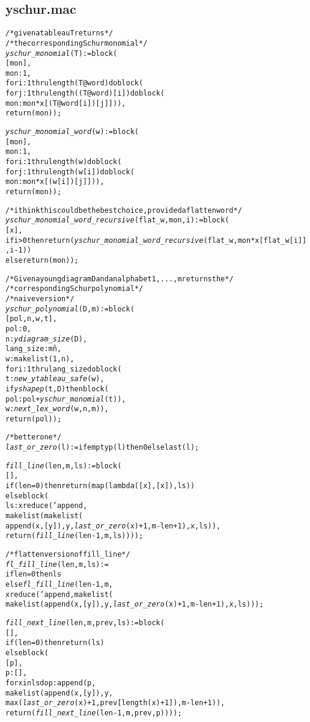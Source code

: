 \subsection*{yschur.mac}
\begin{alltt}
\footnotesize
/* given a tableau T returns */
/* the corresponding Schur monomial */
\emph{yschur\_monomial} (T) := block (
  [mon],
  mon : 1,
  for i : 1 thru length (T@word) do block (
    for j : 1 thru length ((T@word)[i]) do block (
      mon : mon*x[(T@word[i])[j]])),
  return (mon)); 

\emph{yschur\_monomial\_word} (w) := block (
  [mon],
  mon : 1,
  for i : 1 thru length (w) do block (
    for j : 1 thru length (w[i]) do block (
      mon : mon*x[(w[i])[j]])),
  return (mon));

/* i think this could be the best choice, provided a flatten word */
\emph{yschur\_monomial\_word\_recursive} (flat\_w, mon, i) := block (
  [x],
  if i > 0 then return (\emph{yschur\_monomial\_word\_recursive} (flat\_w, mon*x[flat\_w[i]], i-1))
  else return (mon));

/* Given a young diagram D and an alphabet {1,...,m} returns the */
/* corresponding Schur polynomial */
/* naive version */
\emph{yschur\_polynomial} (D, m) := block (
  [pol,n,w,t],
  pol : 0,
  n : \emph{ydiagram\_size} (D),
  lang\_size : m\^n,
  w : makelist (1, n),
  for i : 1 thru lang\_size do block (
    t : \emph{new\_ytableau\_safe} (w),
    if \emph{yshapep} (t,D) then block (
      pol : pol + \emph{yschur\_monomial}(t)),
    w : \emph{next\_lex\_word} (w, n, m)),
  return (pol));

/* better one */
\emph{last\_or\_zero} (l) := if emptyp (l) then 0 else last(l);

\emph{fill\_line} (len, m, ls) := block (
  [],
  if (len = 0) then return (map (lambda ([x], [x]), ls))
  else block (
    ls : xreduce ('append,
      makelist (makelist (
        append (x, [y]), y, \emph{last\_or\_zero} (x) + 1, m - len + 1), x, ls)),
    return (\emph{fill\_line} (len - 1, m, ls))));

/* flatten version of fill\_line */
\emph{fl\_fill\_line} (len, m, ls) :=
if len = 0 then ls
else \emph{fl\_fill\_line} (len - 1, m,
  xreduce ('append, makelist (
    makelist (append (x, [y]), y, \emph{last\_or\_zero} (x) + 1, m - len +1), x, ls)));

\emph{fill\_next\_line} (len, m, prev, ls) := block (
  [],
  if (len = 0) then return (ls)
  else block (
    [p],
    p : [],
    for x in ls do p : append (p,
      makelist (append (x, [y]), y, 
        max (\emph{last\_or\_zero} (x) + 1, prev[length (x)+1]), m - len + 1)),
    return (\emph{fill\_next\_line} (len - 1, m, prev, p))));


\end{alltt}
